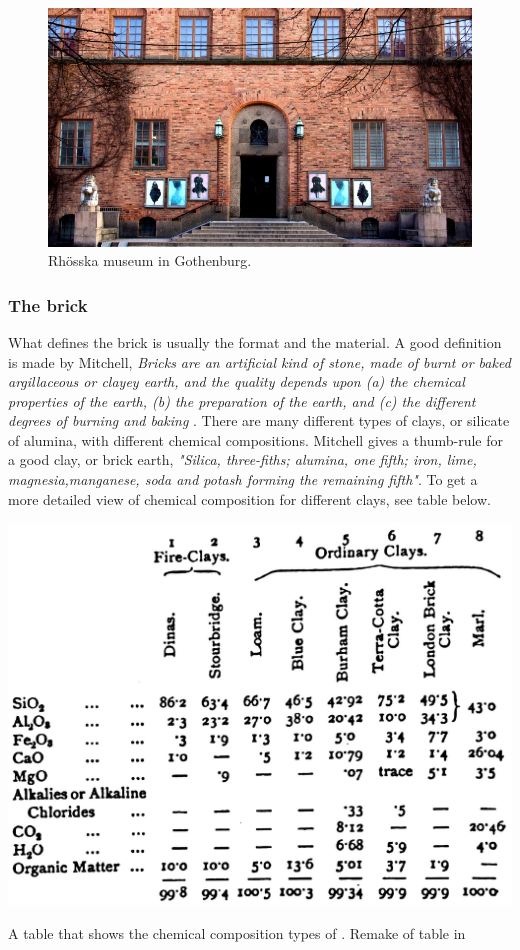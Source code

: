\begin{figure}[H]
\centering
\includegraphics[width=1.0\linewidth ]{figure/Introduction/Rohsska.jpg}
\caption{Rhösska museum in Gothenburg.}
\end{figure}





\subsubsection{The brick}
 
 What defines the brick is  usually the format and the material.  A good definition is made by Mitchell, \textit{Bricks are an artificial kind of stone, made of burnt or baked argillaceous or clayey earth, and the quality  depends upon (a) the chemical properties of the earth, (b) the preparation of the earth, and (c) the different degrees of burning and baking} \cite{ref:Mitchell}.
 There are many different types of clays, or silicate of alumina, with different chemical compositions. Mitchell gives a thumb-rule for a good clay, or brick earth, \textit{"Silica, three-fiths; alumina, one fifth; iron, lime, magnesia,manganese, soda and potash forming the remaining fifth"}\cite{ref:Mitchell}. To get a more detailed view of chemical composition for different clays, see table below. 


\begin{table}[H]
    \centering
    \includegraphics[width=0.7\linewidth ]{figure/Introduction/clays.pdf}
    \caption{ A table that shows the chemical composition types of .  Remake of table in   \cite{ref:Mitchell}}
    \label{tab:my_label}
\end{table}

